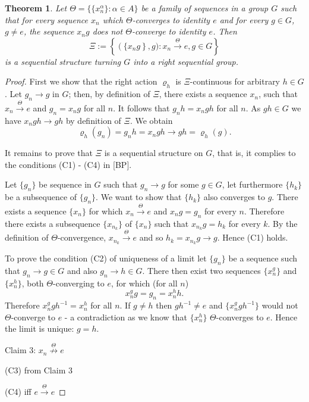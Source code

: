 \documentclass[12pt]{article}
\newtheorem{theorem}{Theorem}
\theoremstyle{definition}
\theoremstyle{remark}
\begin{document}
\begin{theorem}\label{th:grtorsqgr}
Let $\Theta=\{\{x_n^\alpha\}: \alpha\in A\}$ be a family of sequences in a group $G$ such that for every sequence $x_n$ which $\Theta$-converges to identity $e$ and for every $g\in G$, $g\neq e$, the sequence $x_ng$ does not $\Theta$-converge to identity $e$. Then 
\[
    \Xi:=\left\{\left(\{x_ng\right\},g):
    x_n\stackrel{\Theta}{\to} e, g\in G\right\}
\]
is a sequential structure turning $G$ into a right sequential group.
\end{theorem}
\begin{proof}
First we show that the right action $\varrho_h$ is $\Xi$-continuous for arbitrary $h\in G$. Let $g_n\to g$ in $G$; then, by definition of $\Xi$, there exists a sequence $x_n$, such that $x_n\stackrel{\Theta}{\to} e$ and $g_n=x_ng$ for all $n$. It follows that $g_nh=x_ngh$ for all $n$. As $gh\in G$ we have $x_ngh\to gh$ by definition of $\Xi$. We obtain
\[
    \varrho_h(g_n)=g_nh=x_ngh\to gh = \varrho_h(g).
\]

It remains to prove that $\Xi$ is a sequential structure on $G$, that is, it complies to the conditions (C1) - (C4) in [BP].

Let $\{g_n\}$ be sequence in $G$ such that $g_n\to g$ for some $g\in G$, let furthermore $\{h_k\}$ be a subsequence of $\{g_n\}$. We want to show that $\{h_k\}$ also converges to $g$. There exists a sequence $\{x_n\}$ for which $x_n\stackrel{\Theta}{\to} e$ and $x_ng=g_n$ for every $n$. Therefore there exists a subsequence $\{x_{n_k}\}$ of $\{x_n\}$ such that $x_{n_k}g=h_k$ for every $k$. By the definition of $\Theta$-convergence, $x_{n_k}\stackrel{\Theta}{\to} e$ and so $h_k=x_{n_k}g\to g$. Hence (C1) holds.

To prove the condition (C2) of uniqueness of a limit let $\{g_n\}$ be a sequence such that $g_n\to g\in G$ and also $g_n\to h\in G$. There then exist two sequences $\{x_n^g\}$ and $\{x_n^h\}$, both $\Theta$-converging to $e$, for which (for all $n$)
\[
x_n^gg=g_n=x_n^hh.
\]
Therefore $x_n^ggh^{-1}=x_n^h$ for all $n$. If $g\neq h$ then $gh^{-1}\neq e$ and $\{x_n^ggh^{-1}\}$ would not $\Theta$-converge to $e$ - a contradiction as we know that $\{x_n^h\}$ $\Theta$-converges to $e$. Hence the limit is unique: $g=h$.


Claim 3: $x_n\stackrel{\Theta}{\not\to} e$

(C3) from Claim 3

(C4) iff $e\stackrel{\Theta}{\to} e$
\end{proof}
\end{document}
